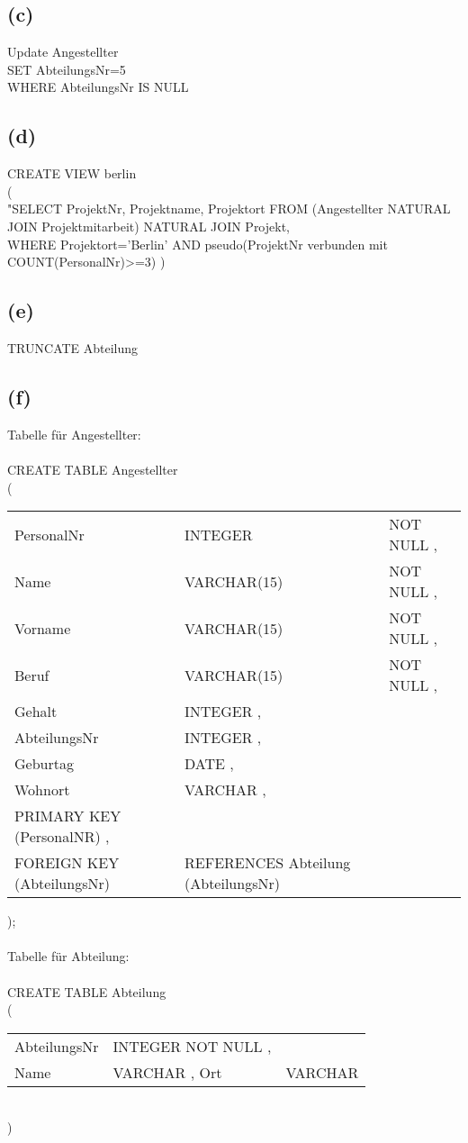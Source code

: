 \documentclass{article}
\begin{document}
\subsection{(c)}
Update Angestellter\\
SET AbteilungsNr=5\\
WHERE AbteilungsNr IS NULL\\

\subsection{(d)}
CREATE VIEW berlin \\
(\\
    "SELECT ProjektNr, Projektname, Projektort
    FROM (Angestellter NATURAL JOIN Projektmitarbeit) NATURAL JOIN Projekt,\\
    WHERE Projektort='Berlin' AND pseudo(ProjektNr verbunden mit COUNT(PersonalNr)>=3)
)



\subsection{(e)}
TRUNCATE Abteilung

\subsection{(f)}
Tabelle für Angestellter: \\ \\
CREATE TABLE Angestellter\\
(\\
\begin{tabular} {l l l}
    PersonalNr & INTEGER & NOT NULL , \\
    Name & VARCHAR(15) & NOT NULL ,\\
    Vorname & VARCHAR(15) & NOT NULL ,\\
    Beruf & VARCHAR(15) & NOT NULL ,\\
    Gehalt & INTEGER ,\\
    AbteilungsNr & INTEGER ,\\
    Geburtag & DATE ,\\
    Wohnort & VARCHAR ,\\
    PRIMARY KEY (PersonalNR) ,\\
    FOREIGN KEY (AbteilungsNr) & REFERENCES Abteilung (AbteilungsNr)\\
\end{tabular}
);\\ \\
Tabelle für Abteilung: \\ \\
CREATE TABLE Abteilung \\
(\\
\begin{tabular}{l l l}
    AbteilungsNr & INTEGER NOT NULL , \\
    Name & VARCHAR ,
    Ort & VARCHAR \\
\end{tabular}
\\

        

)


    
\end{document}
